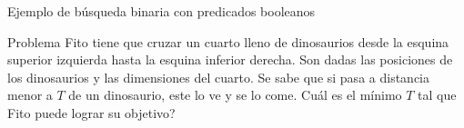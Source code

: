 \documentclass[compress]{beamer}
\begin{document}
\begin{frame}{Ejemplo de b\'usqueda binaria con predicados booleanos}
\begin{block}{Problema}
Fito tiene que cruzar un cuarto lleno de dinosaurios desde la esquina superior izquierda hasta la esquina inferior derecha. Son dadas las posiciones de los dinosaurios y las dimensiones del cuarto. Se sabe que si pasa a distancia menor a $T$ de un dinosaurio, este lo ve y se lo come. Cu\'al es el m\'inimo $T$ tal que Fito puede lograr su objetivo?
\end{block}
\end{frame}
\end{document}
